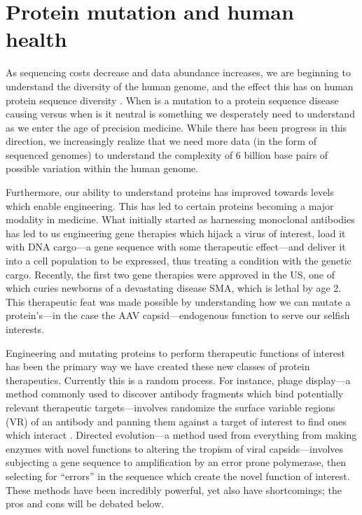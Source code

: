 \section{Protein mutation and human health}

As sequencing costs decrease and data abundance increases, we are beginning to understand the diversity of the human genome, and the effect this has on human protein sequence diversity \cite{Lek2016-eh,Gudbjartsson2015-tg}. When is a mutation to a protein sequence disease causing versus when is it neutral is something we desperately need to understand as we enter the age of precision medicine. While there has been progress in this direction, we increasingly realize that we need more data (in the form of sequenced genomes) to understand the complexity of 6 billion base pairs of possible variation within the human genome. 

Furthermore, our ability to understand proteins has improved towards levels which enable engineering. This has led to certain proteins becoming a major modality in medicine. What initially started as harnessing monoclonal antibodies\cite{Kohler1975-oz} has led to us engineering gene therapies which hijack a virus of interest, load it with DNA cargo---a gene sequence with some therapeutic effect---and deliver it into a cell population to be expressed, thus treating a condition with the genetic cargo\cite{Anguela2019-cd}. Recently, the first two gene therapies were approved in the US, one of which curies newborns of a devastating disease SMA, which is lethal by age 2\cite{Russell2017-so,Mendell2017-ja}. This therapeutic feat was made possible by understanding how we can mutate a protein’s---in the case the AAV capsid---endogenous function to serve our selfish interests. 


Engineering and mutating proteins to perform therapeutic functions of interest has been the primary way we have created these new classes of protein therapeutics. Currently this is a random process. For instance, phage display---a method commonly used to discover antibody fragments which bind potentially relevant therapeutic targets---involves randomize the surface variable regions (VR) of an antibody and panning them against a target of interest to find ones which interact \cite{Smith1985-vr,McCafferty1990-wl}. Directed evolution---a method used from everything from making enzymes\cite{Chen1991-cr} with novel functions to altering the tropism of viral capsids\cite{Grimm2015-jz,Maheshri2006-ac}---involves subjecting a gene sequence to amplification by an error prone polymerase, then selecting for “errors” in the sequence which create the novel function of interest. These methods have been incredibly powerful, yet also have shortcomings; the pros and cons will be debated below. 

